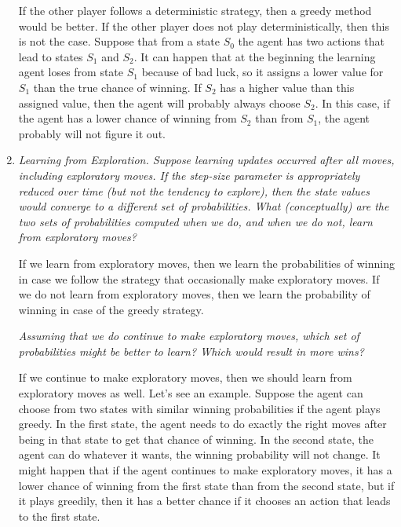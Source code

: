 \documentclass[12pt,a4paper]{article}
\begin{document}
\begin{enumerate}
    If the other player follows a deterministic strategy, then a greedy method would be better. If the other player does not play deterministically, then this is not the case. Suppose that from a state $S_0$ the agent has two actions that lead to states $S_1$ and $S_2$. It can happen that at the beginning the learning agent loses from state $S_1$ because of bad luck, so it assigns a lower value for $S_1$ than the true chance of winning. If $S_2$ has a higher value than this assigned value, then the agent will probably always choose $S_2$. In this case, if the agent has a lower chance of winning from $S_2$ than from $S_1$, the agent probably will not figure it out.

  \item
    \textit{Learning from Exploration. Suppose learning updates occurred after all moves, including exploratory moves. If the step-size parameter is appropriately reduced over time (but not the tendency to explore), then the state values would converge to a different set of probabilities. What (conceptually) are the two sets of probabilities computed when we do, and when we do not, learn from exploratory moves?}

    If we learn from exploratory moves, then we learn the probabilities of winning in case we follow the strategy that occasionally make exploratory moves. If we do not learn from exploratory moves, then we learn the probability of winning in case of the greedy strategy.

    \textit{Assuming that we do continue to make exploratory moves, which set of probabilities might be better to learn? Which would result in more wins?}

    If we continue to make exploratory moves, then we should learn from exploratory moves as well. Let's see an example. Suppose the agent can choose from two states with similar winning probabilities if the agent plays greedy. In the first state, the agent needs to do exactly the right moves after being in that state to get that chance of winning. In the second state, the agent can do whatever it wants, the winning probability will not change. It might happen that if the agent continues to make exploratory moves, it has a lower chance of winning from the first state than from the second state, but if it plays greedily, then it has a better chance if it chooses an action that leads to the first state.



\end{enumerate}
\end{document}
